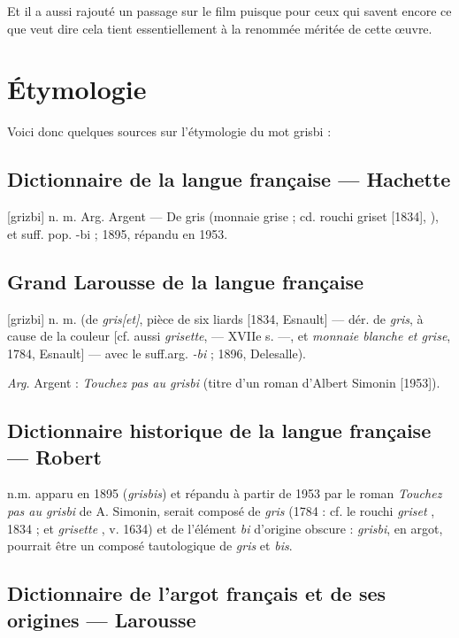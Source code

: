 Et il a aussi rajouté un passage sur le film puisque pour ceux qui savent encore
ce que  veut dire cela tient essentiellement à la renommée méritée de cette \oe uvre.


\section{Étymologie\label{preamble-etymology}}


Voici donc quelques sources sur l'étymologie du mot grisbi :


\subsection*{Dictionnaire de la langue française --- Hachette}

[grizbi] n. m. Arg. Argent --- De gris (monnaie grise ; cd. rouchi griset [1834], ), et suff. pop. -bi ; 1895, répandu en 1953.


\subsection*{Grand Larousse de la langue française}

[grizbi] n. m. (de \emph{gris[et]}, pièce de six liards [1834, Esnault] --- dér.
de \emph{gris}, à cause de la couleur [cf. aussi \emph{grisette},  --- XVIIe s. ---, et \emph{monnaie blanche et grise}, 1784, Esnault] --- avec le suff.arg. \emph{-bi} ; 1896, Delesalle).

\emph{Arg.} Argent : \emph{Touchez pas au grisbi} (titre d'un roman d'Albert
Simonin [1953]).


\subsection*{Dictionnaire historique de la langue française --- Robert}

n.m. apparu en 1895 (\emph{grisbis}) et répandu à partir de 1953 par le roman
\emph{Touchez pas au grisbi} de A. Simonin, serait composé de \emph{gris}
 (1784 : cf. le rouchi \emph{griset} , 1834 ; et \emph{grisette} , v. 1634) et de l'élément \emph{bi} d'origine obscure : \emph{grisbi},  en argot, pourrait être un composé tautologique de \emph{gris} et \emph{bis}.


\subsection*{Dictionnaire de l'argot français et de ses origines --- Larousse}

